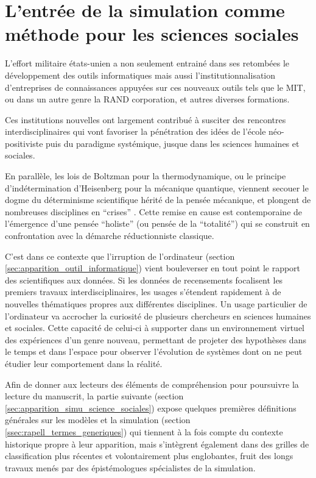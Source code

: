 
\section{L'entrée de la simulation comme méthode pour les sciences sociales}

L'effort militaire états-unien a non seulement entrainé dans ses retombées le développement des outils informatiques mais aussi l'institutionnalisation d'entreprises de connaissances appuyées sur ces nouveaux outils tels que le MIT, ou dans un autre genre la RAND corporation, et autres diverses formations.

Ces institutions nouvelles ont largement contribué à susciter des rencontres interdisciplinaires qui vont favoriser la pénétration des idées de l'école néo-positiviste puis du paradigme systémique, jusque dans les sciences humaines et sociales.

En parallèle, les lois de Boltzman pour la thermodynamique, ou le principe d’indétermination d'Heisenberg pour la mécanique quantique, viennent secouer le dogme du déterminisme scientifique hérité de la pensée mécanique, et plongent de nombreuses disciplines en \enquote{crises} \autocite[20-23]{Pouvreau2013}. Cette remise en cause est contemporaine de l'émergence d'une pensée \enquote{holiste} (ou pensée de la \enquote{totalité}) qui se construit en confrontation avec la démarche réductionniste classique.

C'est dans ce contexte que l'irruption de l'ordinateur (section \ref{sec:apparition_outil_informatique}) vient bouleverser en tout point le rapport des scientifiques aux données. Si les données de recensements focalisent les premiers travaux interdisciplinaires, les usages s'étendent rapidement à de nouvelles thématiques propres aux différentes disciplines. Un usage particulier de l'ordinateur va accrocher la curiosité de plusieurs chercheurs en sciences humaines et sociales. Cette capacité de celui-ci à supporter dans un environnement virtuel des expériences d'un genre nouveau, permettant de projeter des hypothèses dans le temps et dans l'espace pour observer l'évolution de systèmes dont on ne peut étudier leur comportement dans la réalité.

Afin de donner aux lecteurs des éléments de compréhension pour poursuivre la lecture du manuscrit, la partie suivante (section \ref{sec:apparition_simu_science_sociales}) expose quelques premières définitions générales sur les modèles et la simulation (section \ref{ssec:rapell_termes_generiques}) qui tiennent à la fois compte du contexte historique propre à leur apparition, mais s'intègrent également dans des grilles de classification plus récentes et volontairement plus englobantes, fruit des longs travaux menés par des épistémologues spécialistes de la simulation.

